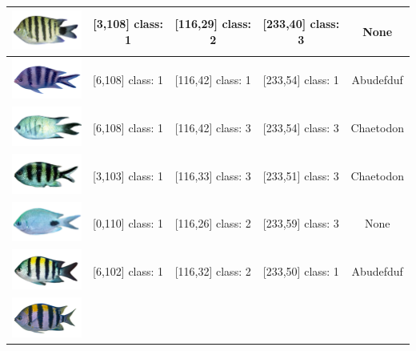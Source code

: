 \begin{longtable}{|c|c|c|c|c|}
	\hline
	\includegraphics[width=3cm]{gambar/dataset_validasi/Abudefduf12}
	& [3,108] class: 1 & [116,29] class: 2 & [233,40] class: 3 & None \\
	\hline
	\includegraphics[width=3cm]{gambar/dataset_validasi/Abudefduf13}
	& [6,108] class: 1 & [116,42] class: 1 & [233,54] class: 1 & Abudefduf \\
	\hline
	\includegraphics[width=3cm]{gambar/dataset_validasi/Abudefduf14}
	& [6,108] class: 1 & [116,42] class: 3 & [233,54] class: 3 & Chaetodon \\
	\hline
	\includegraphics[width=3cm]{gambar/dataset_validasi/Abudefduf15}
	& [3,103] class: 1 & [116,33] class: 3 & [233,51] class: 3 & Chaetodon \\
	\hline
	\includegraphics[width=3cm]{gambar/dataset_validasi/Abudefduf16}
	& [0,110] class: 1 & [116,26] class: 2 & [233,59] class: 3 & None \\
	\hline
	\includegraphics[width=3cm]{gambar/dataset_validasi/Abudefduf17}
	& [6,102] class: 1 & [116,32] class: 2 & [233,50] class: 1 & Abudefduf \\
	\hline
	\includegraphics[width=3cm]{gambar/dataset_validasi/Abudefduf18}

\end{longtable}
